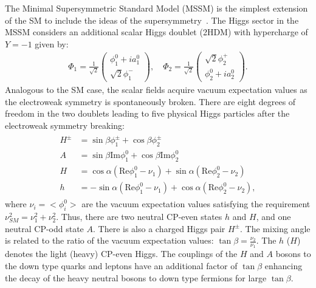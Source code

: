 The Minimal Supersymmetric Standard Model (MSSM) is the simplest extension of the SM to include the ideas of the supersymmetry~\cite{Fayet:1974pd,Fayet:1977yc}. The Higgs sector in the MSSM considers an additional scalar Higgs doublet (2HDM) with hypercharge of $Y=-1$ given by:
\begin{eqnarray} \label{eq:2hdm}
\Phi_1  = \frac{1}{\sqrt{2}}\left(\begin{array}{c} \phi^{0}_1+ia_1^0 \\ \sqrt{2}\phi^{-}_1 \end{array} \right), \quad \Phi_2  = \frac{1}{\sqrt{2}}\left(\begin{array}{c} \sqrt{2}\phi^{+}_2 \\ \phi^{0}_2+ia_2^0 \end{array} \right).
\end{eqnarray}    
Analogous to the SM case, the scalar fields acquire vacuum expectation values as the electroweak symmetry is spontaneously broken. There are eight degrees of freedom in the two doublets leading to five physical Higgs particles after the electroweak symmetry breaking:
\begin{eqnarray} \label{eq:mssm_higgs}
\begin{aligned}
H^{\pm} &= \sin \beta \phi_1^{\pm} + \cos \beta \phi_2^{\pm} \\
A  &= \sin \beta \mathrm{Im}\phi_1^{0} + \cos \beta \mathrm{Im}\phi_2^{0} \\
H  &= \cos \alpha(\mathrm{Re}\phi_1^{0}-\nu_1) + \sin \alpha (\mathrm{Re}\phi_2^{0}-\nu_2) \\
h  &= -\sin \alpha(\mathrm{Re}\phi_1^{0}-\nu_1) + \cos \alpha (\mathrm{Re}\phi_2^{0}-\nu_2),
\end{aligned}
\end{eqnarray}   
where $\nu_i=<\phi_i^0>$ are the vacuum expectation values satisfying the requirement $\nu_{SM}^2 = \nu_1^2 + \nu_2^2$. Thus, there are two neutral CP-even states $h$ and $H$, and one neutral CP-odd state $A$. There is also a charged Higgs pair $H^{\pm}$. The mixing angle is related to the ratio of the vacuum expectation values: $\tan \beta = \frac{\nu_2}{\nu_1}$. The $h$ ($H$) denotes the light (heavy) CP-even Higgs. The couplings of the $H$ and $A$ bosons to the down type quarks and leptons have an additional factor of $\tan \beta$ enhancing the decay of the heavy neutral bosons to down type fermions for large $\tan \beta$.

